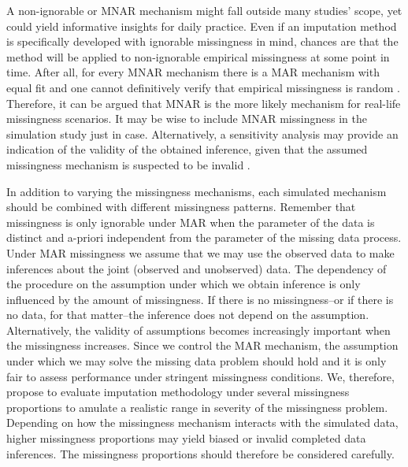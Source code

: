 \documentclass[bimj,fleqn]{w-art}
\begin{document}
A non-ignorable or MNAR mechanism might fall outside many studies' scope, yet could yield informative insights for daily practice. Even if an imputation method is specifically developed with ignorable missingness in mind, chances are that the method will be applied to non-ignorable empirical missingness at some point in time. After all, for every MNAR mechanism there is a MAR mechanism with equal fit and one cannot definitively verify that empirical missingness is random \citep{molenberghs2008every}. Therefore, it can be argued that MNAR is the more likely mechanism for real-life missingness scenarios. It may be wise to include MNAR missingness in the simulation study just in case. Alternatively, a sensitivity analysis may provide an indication of the validity of the obtained inference, given that the assumed missingness mechanism is suspected to be invalid \citep[see e.g.][part 5]{molenberghs2014handbook}.




 

% 


In addition to varying the missingness mechanisms, each simulated mechanism should be combined with different missingness patterns. Remember that missingness is only ignorable under MAR when the parameter of the data is distinct and a-priori independent from the parameter of the missing data process. Under MAR missingness we assume that we may use the observed data to make inferences about the joint (observed and unobserved) data. The dependency of the procedure on the assumption under which we obtain inference is only influenced by the amount of missingness. If there is no missingness--or if there is no data, for that matter--the inference does not depend on the assumption. Alternatively, the validity of assumptions becomes increasingly important when the missingness increases. Since we control the MAR mechanism, the assumption under which we may solve the missing data problem should hold and it is only fair to assess performance under stringent missingness conditions. We, therefore, propose to evaluate imputation methodology under several missingness proportions to amulate a realistic range in severity of the missingness problem. Depending on how the missingness mechanism interacts with the simulated data, higher missingness proportions may yield biased or invalid completed data inferences. The missingness proportions should therefore be considered carefully.
\end{document}
